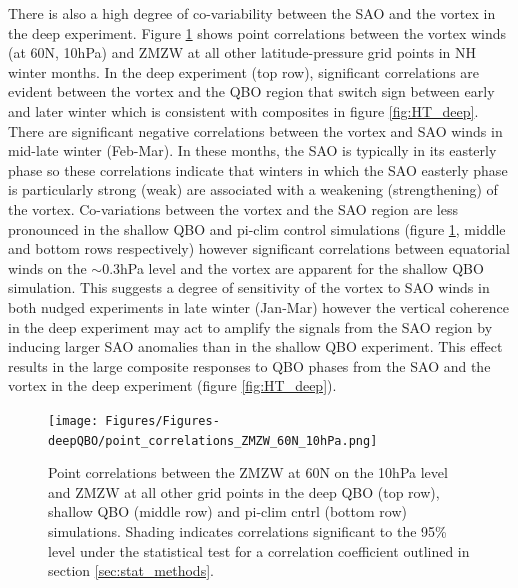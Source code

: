 There is also a high degree of co-variability between the SAO and the vortex in the deep experiment. Figure \ref{fig:point_cors} shows point correlations between the vortex winds (at 60N, 10hPa) and ZMZW at all other latitude-pressure grid points in NH winter months. In the deep experiment (top row), significant correlations are evident between the vortex and the QBO region that switch sign between early and later winter which is consistent with composites in figure \ref{fig:HT_deep}. There are significant negative correlations between the vortex and SAO winds in mid-late winter (Feb-Mar). In these months, the SAO is typically in its easterly phase so these correlations indicate that winters in which the SAO easterly phase is particularly strong (weak) are associated with a weakening (strengthening) of the vortex. Co-variations between the vortex and the SAO region are less pronounced in the shallow QBO and pi-clim control simulations (figure \ref{fig:point_cors}, middle and bottom rows respectively) however significant correlations between equatorial winds on the $\sim$0.3hPa level and the vortex are apparent for the shallow QBO simulation. This suggests a degree of sensitivity of the vortex to SAO winds in both nudged experiments in late winter (Jan-Mar) however the vertical coherence in the deep experiment may act to amplify the signals from the SAO region by inducing larger SAO anomalies than in the shallow QBO experiment. This effect results in the large composite responses to QBO phases from the SAO and the vortex in the deep experiment (figure \ref{fig:HT_deep}).

\begin{figure}[h!]
\begin{center}
\noindent\texttt{[image: Figures/Figures-deepQBO/point\_correlations\_ZMZW\_60N\_10hPa.png]}
\caption[]{Point correlations between the ZMZW at 60N on the 10hPa level and ZMZW at all other grid points in the deep QBO (top row), shallow QBO (middle row) and pi-clim cntrl (bottom row) simulations. Shading indicates correlations significant to the 95\% level under the statistical test for a correlation coefficient outlined in section \ref{sec:stat_methods}.}
\label{fig:point_cors}
\end{center}
\end{figure}

